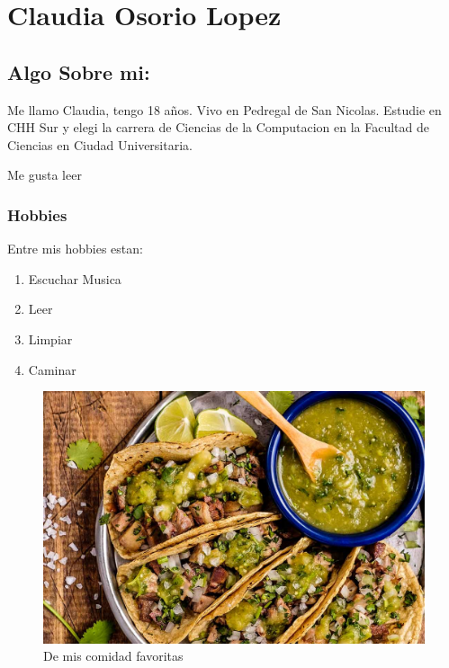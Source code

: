 \chapter{Claudia Osorio Lopez}

\section{Algo Sobre mi:}
Me llamo Claudia, tengo 18 años. Vivo en Pedregal de San Nicolas. Estudie en CHH Sur y elegi la carrera de Ciencias de la Computacion en la Facultad de Ciencias en Ciudad Universitaria.

Me gusta leer~\cite{Floodlight,Tokuyama}


\subsection{Hobbies}
Entre mis hobbies estan:
\begin{enumerate}
  \item Escuchar Musica
  \item Leer
  \item Limpiar
  \item Caminar
\end{enumerate}

\begin{figure}[h]
  \centering
  \includegraphics[scale=0.2]{IMG/tacos.jpg}
  \caption{De mis comidad favoritas}
  \label{fig:tacos}
\end{figure}
